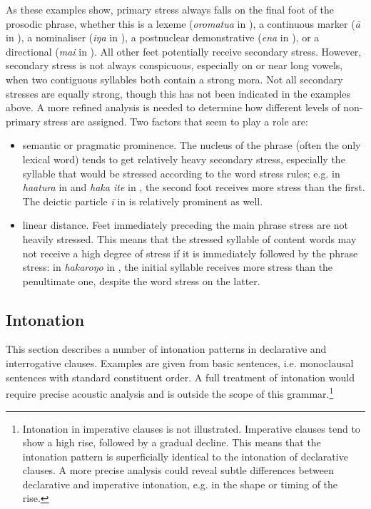 As these examples show, primary stress always falls on the final foot of the prosodic phrase, whether this is a lexeme (\textit{oromatu}\textit{{\ꞌ}}\textit{a} in ), a continuous marker (\textit{{\ꞌ}ā} in ), a nominaliser (\textit{iŋa} in ), a postnuclear demonstrative (\textit{ena} in ), or a directional (\textit{mai} in ). All other feet potentially receive secondary stress. However, secondary stress is not always conspicuous, especially on or near long vowels, when two contiguous syllables both contain a strong mora.
Not all secondary stresses are equally strong, though this has not been indicated in the examples above. A more refined analysis is needed to determine how different levels of non-primary stress are assigned. Two factors that seem to play a role are:

\begin{itemize}
\item 
semantic or pragmatic prominence. The nucleus of the phrase (often the only lexical word) tends to get relatively heavy secondary stress, especially the syllable that would be stressed according to the word stress rules; e.g. in \textit{ha{\ꞌ}atura} in  and \textit{haka {\ꞌ}ite} in , the second foot receives more stress than the first. The deictic particle \textit{{\ꞌ}ī} in  is relatively prominent as well.

\item 
linear distance. Feet immediately preceding the main phrase stress are not heavily stressed. This means that the stressed syllable of content words may not receive a high degree of stress if it is immediately followed by the phrase stress: in \textit{hakaroŋo} in , the initial syllable receives more stress than the penultimate one, despite the word stress on the latter.

\end{itemize}
\subsection{Intonation}\label{sec:2.4.2}
This section describes a number of intonation patterns in declarative and interrogative clauses. Examples are given from basic sentences, i.e. monoclausal sentences with standard constituent order. A full treatment of intonation would require precise acoustic analysis and is outside the scope of this grammar.\footnote{\label{fn:58}Intonation in imperative clauses is not illustrated. Imperative clauses tend to show a high rise, followed by a gradual decline. This means that the intonation pattern is superficially identical to the intonation of declarative clauses. A more precise analysis could reveal subtle differences between declarative and imperative intonation, e.g. in the shape or timing of the rise.} 

